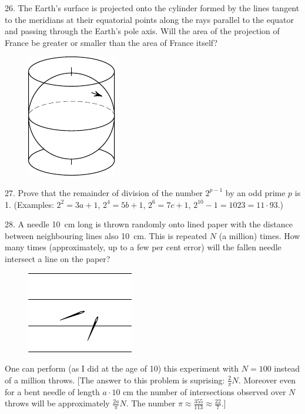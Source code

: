 \begin{problem}{26.}
	The Earth's surface is projected onto the cylinder formed by the lines tangent to the meridians
	at their equatorial points along the rays parallel to the equator and passing through the Earth's pole axis.
	Will the area of the projection of France be greater or smaller than the area of France itself?
	\begin{figure}
		\includegraphics{taskbook-10}
	\end{figure}
\end{problem}

\begin{problem}{27.}
	Prove that the remainder of division of the number $2^{p-1}$ by an odd prime $p$ is 1.
	(Examples: $2^2 = 3a +1$, $2^4 = 5b+1$, $2^6 = 7c+1$, $2^{10} - 1 = 1023 = 11\cdot 93$.)  
\end{problem}

\begin{problem}{28.}
	A needle \SI{10}{\cm} long is thrown randomly onto lined paper with the distance between neighbouring
	lines also \SI{10}{\cm}. This is repeated
	$N$ (a million) times. 
	How many times (approximately, up to a few per
	cent error) will the fallen needle intersect a line on the paper?
	\begin{figure}
		\includegraphics[scale=1]{taskbook-12}
	\end{figure}
	One can perform (as I did at the age of 10) this experiment with $N=100$ instead of a million throws.
	[The answer to this problem is suprising: $\frac2{\pi}N$. Moreover even for a bent needle of length $a \cdot 10$
	cm the number of intersections observed over $N$ throws will be approximately $\frac{2a}{\pi}N$. 
	The number $\pi \approx  \frac{355}{113} \approx \frac{22}7.$]
\end{problem}

